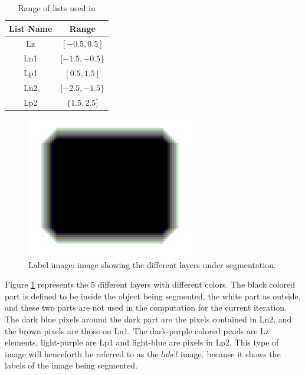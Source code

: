 \begin{table}[h] %
	\begin{tabular}{| c | c |} 
	\hline
	List Name & Range\\ 
	\hline
	Lz & $[-0.5, 0.5]$\\
	Ln1 & $[-1.5, -0.5\}$\\
	Lp1 & $[0.5, 1.5]$\\
	Ln2 & $[-2.5, -1.5\}$\\
	Lp2 & $\{1.5, 2.5]$\\
	\hline
	\end{tabular}
	\caption{Range of lists used in \cite{lankton09}}
	\label{rangeTab1}
\end{table}

\begin{figure}[h!]
\centering
\includegraphics[width=0.65\textwidth]{implemented/labelExample}
\caption{Label image: image showing the different layers under segmentation.}
\label{labelExample}
\end{figure}

Figure \ref{labelExample} represents the 5 different layers with different colors. The black colored part is defined to be inside the object being segmented, the white part as outside, and these two parts are not used in the computation for the current iteration. The dark blue pixels around the dark part are the pixels contained in Ln2, and the brown pixels are those on Ln1. The dark-purple colored pixels are Lz elements, light-purple are Lp1 and light-blue are pixels in Lp2. This type of image will henceforth be referred to as the $label$ image, because it shows the labels of the image being segmented.

